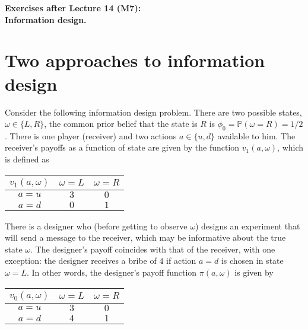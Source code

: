 \documentclass[a4paper]{article}
\begin{document}
\begin{center}
		\LARGE\textbf{Exercises after Lecture 14 (M7):\\ Information design.}
\end{center}



\section{Two approaches to information design}
	
	Consider the following information design problem. There are two possible states, $\omega \in \{L,R\}$, the common prior belief that the state is $R$ is $\phi_0 = \mathbb{P}(\omega = R) = 1/2$. There is one player (receiver) and two actions $a \in \{u,d\}$ available to him. The receiver's payoffs as a function of state are given by the function $v_1(a,\omega)$, which is defined as
	\begin{center}
		\begin{tabular}{c | c | c |}
			$v_1(a,\omega)$ 		& $\omega = L$ 	& $\omega = R$ \\ \hline
			$a=u$	& $3$ 	& $0$	\\ \hline
			$a=d$	& $0$ 	& $1$	\\ \hline
		\end{tabular}
	\end{center}
	There is a designer who (before getting to observe $\omega$) designs an experiment that will send a message to the receiver, which may be informative about the true state $\omega$. The designer's payoff coincides with that of the receiver, with one exception: the designer receives a bribe of $4$ if action $a=d$ is chosen in state $\omega=L$. In other words, the designer's payoff function $\pi(a,\omega)$ is given by
	\begin{center}
		\begin{tabular}{c | c | c |}
			$v_0(a,\omega)$ 		& $\omega = L$ 	& $\omega = R$ \\ \hline
			$a=u$	& $3$ 	& $0$	\\ \hline
			$a=d$	& $4$ 	& $1$	\\ \hline
		\end{tabular}
	\end{center}
	
\end{document}
